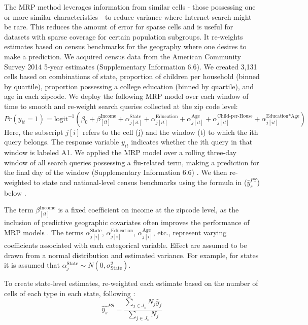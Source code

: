 \documentclass[fleqn,10pt]{wlscirep}
\begin{document}
The MRP method leverages information from similar cells - those possessing one or more similar characteristics - to reduce variance where Internet search might be rare. This reduces the amount of error for sparse cells and is useful for datasets with sparse coverage for certain population subgroups. It re-weights estimates based on census benchmarks for the geography where one desires to make a prediction. We acquired census data from the American Community Survey 2014 5-year estimates (Supplementary Information 6.6). We created 3,131 cells based on combinations of state, proportion of children per household (binned by quartile), proportion possessing a college education (binned by quartile), and age in each zipcode.  We deploy the following MRP model over each window of time to smooth and re-weight search queries collected at the zip code level:
\begin{equation}
Pr(y_{it} = 1) = \text{logit}^{-1}\left( \beta_0  + \beta_{[it]}^{\text{Income}}
+ \alpha_{j[it]}^{\text{State}}
+ \alpha_{j[it]}^{\text{Education} }
+ \alpha_{j[it]}^{\text{Age} }
+ \alpha_{j[it]}^{\text{Child-per-House}}
+ \alpha_{j[it]}^{\text{Education*Age}} \right)
\end{equation}
Here, the subscript $j[i]$ refers to the cell (j) and the window (t) to which the ith query belongs. The response variable $y_{it}$ indicates whether the ith query in that window is labeled A1. We applied the MRP model over a rolling three-day window of all search queries possessing a flu-related term, making a prediction for the final day of the window (Supplementary Information 6.6) \cite{bates_etal_2015}. We then re-weighted to state and national-level census benchmarks using the formula in ($\hat{y}_s^{PS}$) below \cite{wang2015forecasting}. 

The term $\beta_{[it]}^{\text{Income}}$ is a fixed coefficient on income at the zipcode level, as the inclusion of predictive geographic covariates often improves the performance of MRP models \cite{buttice_and_highton_2013}. The terms $\alpha_{j[i]}^{\text{State}}$,  $\alpha_{j[i]}^{\text{Education}}$,  $\alpha_{j[i]}^{\text{Age}}$, etc., represent varying coefficients associated with each categorical variable. Effect are assumed to be drawn from a normal distribution and estimated variance. For example, for states it is assumed that $\alpha_j^{\text{State}} \sim  N (0, \sigma_{\text{State}}^2)$.  

To create state-level estimates, re-weighted each estimate based on the number of cells of each type in each state, following \cite{wang2015forecasting}:
\begin{equation}
\hat{y_s}^{PS} = 
\frac{ \sum_{ j \in J_s } N_j \hat{y}_j }{\sum_{ j \in J_s } N_j}
\end{equation}
\end{document}
